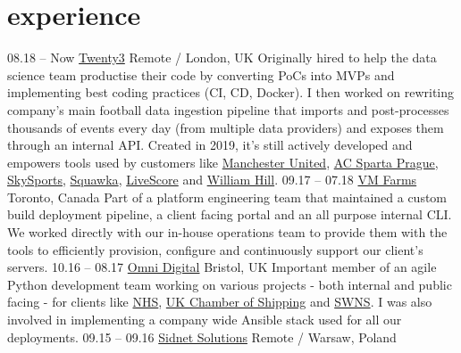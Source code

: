 \documentclass[]{cv-style}  %
\begin{document}

\section{experience}
  \vspace{-0.25cm}

\begin{entrylist}
\entry
  {08.18 -- Now}
  {\href{https://twenty3.sport/}{Twenty3}}
  {Remote / London, UK}
  {Originally hired to help the data science team productise their code by converting PoCs into MVPs and implementing best coding practices (CI, CD, Docker). I then worked on rewriting company's main football data ingestion pipeline that imports and post-processes thousands of events every day (from multiple data providers) and exposes them through an internal API. Created in 2019, it's still actively developed and empowers tools used by customers like \href{https://www.manutd.com/}{Manchester United}, \href{https://sparta.cz/}{AC Sparta Prague}, \href{https://www.skysports.com/}{SkySports}, \href{https://www.squawka.com/}{Squawka}, \href{https://www.livescore.com/}{LiveScore} and \href{https://www.williamhill.com/}{William Hill}.}
\entry
  {09.17 -- 07.18}
  {\href{https://vmfarms.com/}{VM Farms}}
  {Toronto, Canada}
  {Part of a platform engineering team that maintained a custom build deployment pipeline, a client facing portal and an all purpose internal CLI. We worked directly with our in-house operations team to provide them with the tools to efficiently provision, configure and continuously support our client's servers.}
\entry
  {10.16 -- 08.17}
  {\href{https://omni-digital.co.uk/}{Omni Digital}}
  {Bristol, UK}
  {Important member of an agile Python development team working on various projects - both internal and public facing - for clients like \href{https://www.bristolccg.nhs.uk/}{NHS}, \href{https://www.ukchamberofshipping.com/}{UK Chamber of Shipping} and \href{http://swns.com/}{SWNS}. I was also involved in implementing a company wide Ansible stack used for all our deployments.}
\entry
  {09.15 -- 09.16}
  {\href{https://sidnet.info/}{Sidnet Solutions}}
  {Remote / Warsaw, Poland}

\end{entrylist}
\end{document}

